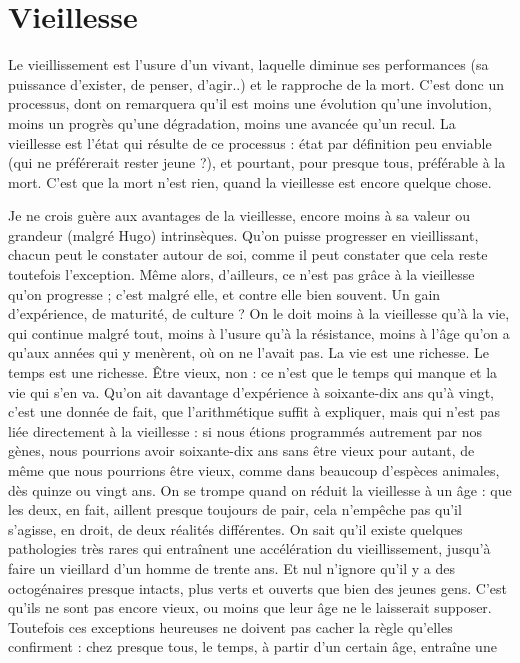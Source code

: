 \section{Vieillesse}
Le vieillissement est l’usure d’un vivant, laquelle diminue ses
performances (sa puissance d’exister, de penser, d’agir..) et le
rapproche de la mort. C’est donc un processus, dont on remarquera qu'il est
moins une évolution qu’une involution, moins un progrès qu’une dégradation,
moins une avancée qu'un recul. La vieillesse est l’état qui résulte de ce
processus : état par définition peu enviable (qui ne préférerait rester jeune ?), et
pourtant, pour presque tous, préférable à la mort. C’est que la mort n'est rien,
quand la vieillesse est encore quelque chose.

Je ne crois guère aux avantages de la vieillesse, encore moins à sa valeur ou
grandeur (malgré Hugo) intrinsèques. Qu’on puisse progresser en vieillissant,
chacun peut le constater autour de soi, comme il peut constater que cela reste
toutefois l’exception. Même alors, d’ailleurs, ce n’est pas grâce à la vieillesse
qu’on progresse ; c’est malgré elle, et contre elle bien souvent. Un gain d’expérience,
de maturité, de culture ? On le doit moins à la vieillesse qu’à la vie, qui
continue malgré tout, moins à l’usure qu’à la résistance, moins à l’âge qu'on a
qu'aux années qui y menèrent, où on ne l’avait pas. La vie est une richesse. Le
temps est une richesse. Être vieux, non : ce n’est que le temps qui manque et la
vie qui s’en va. Qu'on ait davantage d’expérience à soixante-dix ans qu'à vingt,
c'est une donnée de fait, que l’arithmétique suffit à expliquer, mais qui n’est
pas liée directement à la vieillesse : si nous étions programmés autrement par
nos gènes, nous pourrions avoir soixante-dix ans sans être vieux pour autant, de
même que nous pourrions être vieux, comme dans beaucoup d'espèces animales,
dès quinze ou vingt ans. On se trompe quand on réduit la vieillesse à un
âge : que les deux, en fait, aillent presque toujours de pair, cela n’empêche pas
qu’il s’agisse, en droit, de deux réalités différentes. On sait qu’il existe quelques
pathologies très rares qui entraînent une accélération du vieillissement, jusqu’à
faire un vieillard d’un homme de trente ans. Et nul n’ignore qu’il y a des octogénaires
presque intacts, plus verts et ouverts que bien des jeunes gens. C'est
qu’ils ne sont pas encore vieux, ou moins que leur âge ne le laisserait supposer.
Toutefois ces exceptions heureuses ne doivent pas cacher la règle qu’elles
confirment : chez presque tous, le temps, à partir d’un certain âge, entraîne une
